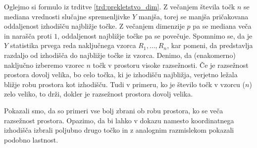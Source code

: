 \documentclass[12pt,a4paper,twoside]{article}
\theoremstyle{definition} %
\theoremstyle{plain} %
\numberwithin{equation}{section}  %
\begin{document}




Oglejmo si formulo iz trditve \ref{trd:prekletstvo_dim}.
Z večanjem števila točk $n$ se mediana vrednosti slučajne spremenljivke $Y$ manjša, torej se manjša pričakovana oddaljenost izhodišču najbližje točke.
Z večanjem dimenzije $p$ pa se mediana veča in narašča proti $1$, oddaljenost najbližje točke pa se povečuje.
Spomnimo se, da je $Y$ statistika prvega reda naključnega vzorca $R_1, \ldots, R_n$, kar pomeni, da predstavlja razdaljo od izhodišča do najbližje točke iz vzorca.
Denimo, da (enakomerno) naključno izberemo vzorec $n$ točk v prostoru visoke razsežnosti.
Če je razsežnost prostora dovolj velika, bo celo točka, ki je izhodišču najbližja, verjetno ležala bližje robu prostora kot izhodišču.
Tudi v primeru, ko je število točk v vzorcu ($n$) zelo veliko, to drži, dokler je razsežnost prostora dovolj velika.

Pokazali smo, da so primeri vse bolj zbrani ob robu prostora, ko se veča razsežnost prostora. 
Opazimo, da bi lahko v dokazu namesto koordinatnega izhodišča izbrali poljubno drugo točko in z analognim razmislekom pokazali podobno lastnost.
\end{document}

